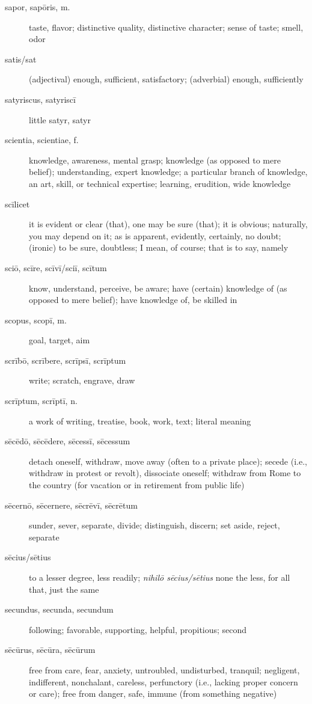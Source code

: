 \begin{description}
    \item[sapor, sapōris, m.] taste, flavor; distinctive quality, distinctive character; sense of taste; smell, odor
    \item[satis/sat] (adjectival) enough, sufficient, satisfactory; (adverbial) enough, sufficiently
    \item[satyriscus, satyriscī] little satyr, satyr
    \item[scientia, scientiae, f.] \marginnote{*}knowledge, awareness, mental grasp; knowledge (as opposed to mere belief); understanding, expert knowledge; a particular branch of knowledge, an art, skill, or technical expertise; learning, erudition, wide knowledge
    \item[scīlicet] it is evident or clear (that), one may be sure (that); it is obvious; naturally, you may depend on it; as is apparent, evidently, certainly, no doubt; (ironic) to be sure, doubtless; I mean, of course; that is to say, namely
    \item[sciō, scīre, scīvī/sciī, scītum] \marginnote{*}know, understand, perceive, be aware; have (certain) knowledge of (as opposed to mere belief);  have knowledge of, be skilled in
    \item[scopus, scopī, m.] goal, target, aim
    \item[scrībō, scrībere, scrīpsī, scrīptum] write; scratch, engrave, draw
    \item[scrīptum, scrīptī, n.] a work of writing, treatise, book, work, text; literal meaning
    \item[sēcēdō, sēcēdere, sēcessī, sēcessum] detach oneself, withdraw, move away (often to a private place); secede (i.e., withdraw in protest or revolt), dissociate oneself; withdraw from Rome to the country (for vacation or in retirement from public life)
    \item[sēcernō, sēcernere, sēcrēvī, sēcrētum] sunder, sever, separate, divide; distinguish, discern; set aside, reject, separate
    \item[sēcius/sētius] to a lesser degree, less readily; \textit{nihilō sēcius/sētius} none the less, for all that, just the same
    \item[secundus, secunda, secundum] \marginnote{*}following; favorable, supporting, helpful, propitious; second
    \item[sēcūrus, sēcūra, sēcūrum] \marginnote{*}free from care, fear, anxiety, untroubled, undisturbed, tranquil; negligent, indifferent, nonchalant, careless, perfunctory (i.e., lacking proper concern or care); free from danger, safe, immune (from something negative)

\end{description}
